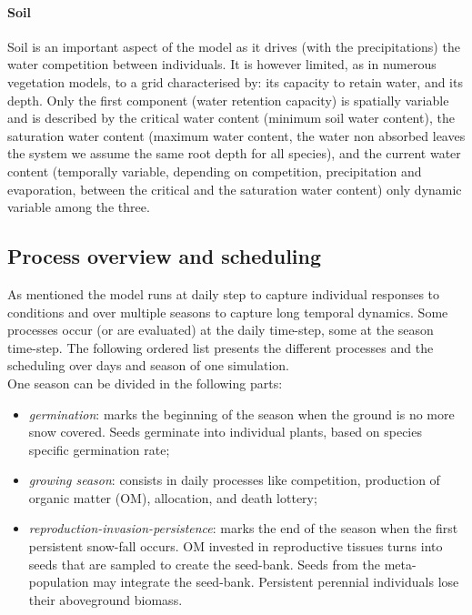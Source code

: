 \documentclass[a4paper,twoside, justified,marginals=raggedright]{tufte-handout}
\begin{document}
\paragraph{Soil} Soil is an important aspect of the model as it drives (with the precipitations) the water competition between individuals. It is however limited, as in numerous vegetation models, to a grid characterised by: its capacity to retain water, and its depth. Only the first component (water retention capacity) is spatially variable and is described by the critical water content (minimum soil water content), the saturation water content (maximum water content, the water non absorbed leaves the system we assume the same root depth for all species), and the current water content (temporally variable, depending on competition, precipitation and evaporation, between the critical and the saturation water content) only dynamic variable among the three.


\subsection{Process overview and scheduling}

As mentioned the model runs at daily step to capture individual responses to conditions and over multiple seasons to capture long temporal dynamics. Some processes occur (or are evaluated) at the daily time-step, some at the season time-step. The following ordered list presents the different processes and the scheduling over days and season of one simulation.\\
\indent One season can be divided in the following parts:
\begin{itemize}
\setlength\itemsep{0em}
\item \textit{germination}: marks the beginning of the season when the ground is no more snow covered. Seeds germinate into individual plants, based on species specific germination rate;
\item \textit{growing season}: consists in daily processes like competition, production of organic matter (OM), allocation, and death lottery;
\item \textit{reproduction-invasion-persistence}: marks the end of the season when the first persistent snow-fall occurs. OM invested in reproductive tissues turns into seeds that are sampled to create the seed-bank. Seeds from the meta-population may integrate the seed-bank. Persistent perennial individuals lose their aboveground biomass.
\end{itemize}
\end{document}

